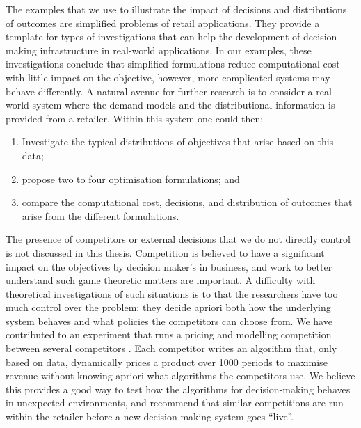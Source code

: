 \documentclass[main.tex]{subfiles}
\begin{document}
The examples that we use to illustrate the
impact of decisions and distributions of outcomes are simplified
problems of retail applications. They provide a template for types
of investigations that can help the development of decision making
infrastructure in real-world applications.
In our examples, these investigations conclude that simplified
formulations reduce computational cost with little impact on the
objective, however, more complicated systems may behave differently.
A natural avenue for further
research is to consider a real-world system where the demand models
and the distributional information is provided from a retailer. Within
this system one could then:
\begin{enumerate}
\item Investigate the typical distributions of objectives that
  arise based on this data;
\item propose two to four optimisation formulations; and
\item compare the computational cost, decisions, and distribution of
  outcomes that arise from the different formulations.
\end{enumerate}

The presence of competitors or external decisions that we do not
directly control is not discussed in this thesis. Competition is believed to
have a significant impact on the objectives by decision maker's in
business, and work to better understand such game theoretic matters
are important. A difficulty with theoretical investigations of
such situations is to that the researchers have too much control over
the problem: they decide apriori both how the underlying system
behaves and what policies the competitors can choose from.  We have
contributed to an
experiment that runs a pricing and
modelling competition between several competitors
\citep{geer2018dynamic}.  Each competitor writes an algorithm that,
only based on data, dynamically prices a product over \num{1000}
periods to maximise revenue without knowing apriori what algorithms
the competitors use. We believe this provides a good way to test how
the algorithms for decision-making behaves in unexpected environments,
and recommend that similar competitions are run within the retailer
before a new decision-making system goes ``live''.



\biblio{} %
\end{document}
